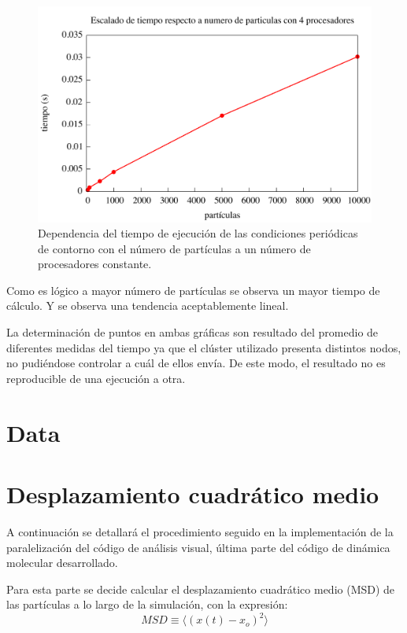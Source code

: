 \documentclass[onecolumn]{article}
\begin{document}
 \begin{figure}[h!]
	\includegraphics[scale=0.4]{lorena_particulas.pdf}
	\caption{Dependencia del tiempo de ejecución de las condiciones periódicas de contorno con el número de partículas a un número de procesadores constante.}
\end{figure}

Como es lógico a mayor número de partículas se observa un mayor tiempo de cálculo. Y se observa una tendencia aceptablemente lineal.

La determinación de puntos en ambas gráficas son resultado del promedio de diferentes medidas del tiempo ya que el clúster utilizado presenta distintos nodos, no pudiéndose controlar a cuál de ellos envía. De este modo, el resultado no es reproducible de una ejecución a otra.




\section{Data}



\section{Desplazamiento cuadrático medio}

A continuación se detallará el procedimiento seguido en la implementación de la paralelización del código de análisis visual, última parte del código de dinámica molecular desarrollado.

Para esta parte se decide calcular el desplazamiento cuadrático medio (MSD) de las partículas a lo largo de la simulación, con la expresión:
\begin{equation}\label{eq: expresion msd alberto}
MSD \equiv \langle\left(x(t)-x_{o}\right)^{2}\rangle
\end{equation}
\end{document}
